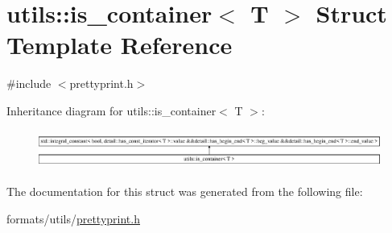 \hypertarget{structutils_1_1is__container}{}\section{utils\+::is\+\_\+container$<$ T $>$ Struct Template Reference}
\label{structutils_1_1is__container}


{\ttfamily \#include $<$prettyprint.\+h$>$}

Inheritance diagram for utils\+::is\+\_\+container$<$ T $>$\+:\begin{figure}[H]
\begin{center}
\leavevmode
\includegraphics[height=1.265537cm]{d9/dfd/structutils_1_1is__container}
\end{center}
\end{figure}


The documentation for this struct was generated from the following file\+:\begin{DoxyCompactItemize}
\item 
formats/utils/\mbox{\hyperlink{prettyprint_8h}{prettyprint.\+h}}\end{DoxyCompactItemize}
